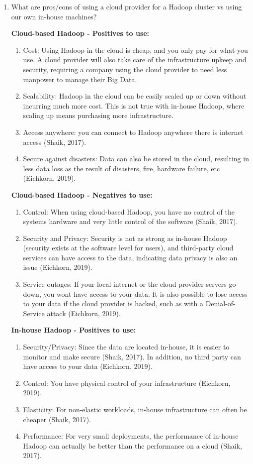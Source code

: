 \documentclass[]{article}
\begin{document}
\begin{enumerate}
	\item What are pros/cons of using a cloud provider for a Hadoop cluster vs using our own in-house machines?

	\textbf{Cloud-based Hadoop - Positives to use:}
	
	\begin{enumerate}
		\item Cost:  Using Hadoop in the cloud is cheap, and you only pay for what you use.  A cloud provider will also take care of the infrastructure upkeep and security, requiring a company using the cloud provider to need less manpower to manage their Big Data.
		\item Scalability: Hadoop in the cloud can be easily scaled up or down without incurring much more cost.  This is not true with in-house Hadoop, where scaling up means purchasing more infrastructure.
		\item Access anywhere:  you can connect to Hadoop anywhere there is internet access (Shaik, 2017).  
		\item Secure against disasters: Data can also be stored in the cloud, resulting in less data loss as the result of disasters, fire, hardware failure, etc (Eichkorn, 2019).
	\end{enumerate}

	\textbf{Cloud-based Hadoop - Negatives to use:}
	
	\begin{enumerate}
		\item Control: When using cloud-based Hadoop, you have no control of the systems hardware and very little control of the software (Shaik, 2017).
		\item Security and Privacy: Security is not as strong as in-house Hadoop (security exists at the software level for users), and third-party cloud services can have access to the data, indicating data privacy is also an issue (Eichkorn, 2019).
		\item Service outages: If your local internet or the cloud provider servers go down, you wont have access to your data.  It is also possible to lose access to your data if the cloud provider is hacked, such as with a Denial-of-Service attack (Eichkorn, 2019).
	\end{enumerate}

	\textbf{In-house Hadoop - Positives to use:}
	
	\begin{enumerate}
		\item Security/Privacy: Since the data are located in-house, it is easier to monitor and make secure (Shaik, 2017).  In addition, no third party can have access to your data (Eichkorn, 2019).
		\item Control: You have physical control of your infrastructure (Eichkorn, 2019).
		\item Elasticity: For non-elastic workloads, in-house infrastructure can often be cheaper (Shaik, 2017).
		\item Performance: For very small deployments, the performance of in-house Hadoop can actually be better than the performance on a cloud (Shaik, 2017).
	\end{enumerate}	


\end{enumerate}
\end{document}
